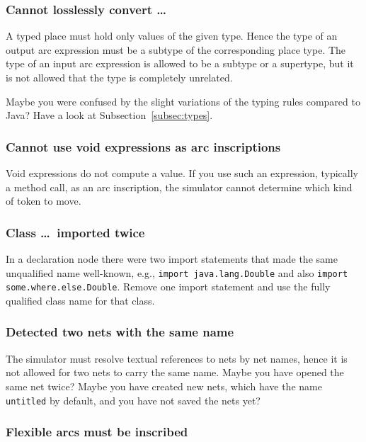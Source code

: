 \subsubsection{Cannot losslessly convert \dots}

A typed place must hold only values of the given type.
Hence the type of an output arc expression must be
a subtype of the corresponding place type. The type
of an input arc expression is allowed to be
a subtype or a supertype, but it is not allowed
that the type is completely unrelated.

Maybe you were confused by the slight variations
of the typing rules compared to Java? Have a look at
Subsection~\ref{subsec:types}.

\subsubsection{Cannot use void expressions as arc inscriptions}

Void expressions do not compute a value. If you use
such an expression, typically a method call, as
an arc inscription, the simulator cannot determine
which kind of token to move.

\subsubsection{Class \dots\ imported twice}

In a declaration node there were two import statements
that made the same unqualified name well-known, e.g.,
\texttt{import java.lang.Double} and also
\texttt{import some.where.else.Double}.
Remove one import statement and use the fully qualified
class name for that class.

\subsubsection{Detected two nets with the same name}

The simulator must resolve textual references to nets
by net names, hence it is not allowed for two nets to
carry the same name. Maybe you have opened the same net twice?
Maybe you have created new nets, which have the name
\texttt{untitled} by default, and you have not saved
the nets yet?

\subsubsection{Flexible arcs must be inscribed}

